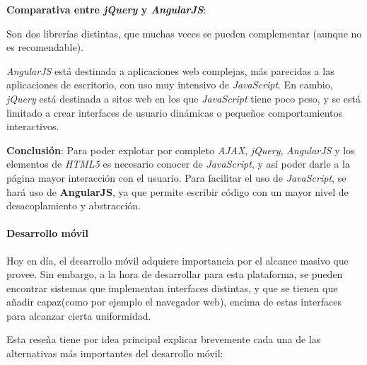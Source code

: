 \textbf{Comparativa entre \textit{jQuery} y \textit{AngularJS}}:

Son dos librerías distintas, que muchas veces se pueden complementar (aunque no es recomendable).

\textit{AngularJS} está destinada a aplicaciones web complejas, más parecidas a las aplicaciones de escritorio, con uso muy intensivo de \textit{JavaScript}.
En cambio, \textit{jQuery} está destinada a sitos web en los que \textit{JavaScript} tiene poco peso, y se está limitado a crear interfaces de usuario dinámicas o pequeños comportamientos interactivos.

\textbf{Conclusión}:
Para poder explotar por completo \textit{AJAX}, \textit{jQuery}, \textit{AngularJS} y los elementos de \textit{HTML5} es necesario conocer de \textit{JavaScript}, y así poder darle a la página mayor interacción con el usuario. 
Para facilitar el uso de \textit{JavaScript}, se hará uso de \textbf{AngularJS}, ya que permite escribir código con un mayor nivel de desacoplamiento y abstracción.


\paragraph{Desarrollo móvil}

Hoy en día, el desarrollo móvil adquiere importancia por el alcance masivo que provee.
Sin embargo, a la hora de desarrollar para esta plataforma, se pueden encontrar sistemas que implementan interfaces distintas, y que se tienen que añadir capaz(como por ejemplo el navegador web), encima de estas interfaces para alcanzar cierta uniformidad.

Esta reseña tiene por idea principal explicar brevemente cada una de las alternativas más importantes del desarrollo móvil:

